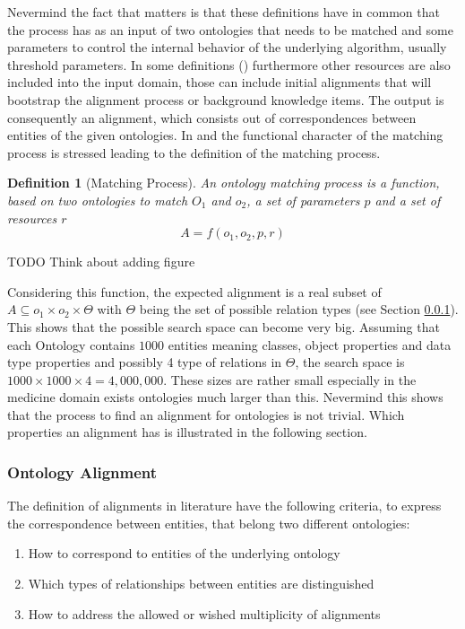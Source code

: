 \documentclass[11pt,titlepage,oneside,openany,a4paper]{report}
\newtheorem{definition}{Definition}[chapter]
\begin{document}
Nevermind the fact that matters is that these definitions have in common that the process has as an input of two ontologies that needs to be matched and some parameters to control the internal behavior of the underlying algorithm, usually threshold parameters. In some definitions (\cite{euzenat2004api}) furthermore other resources are also included into the input domain, those can include initial alignments that will bootstrap the alignment process or background knowledge items. The output is consequently an alignment, which consists out of correspondences between entities of the given ontologies. In \cite{euzenat2013d} and  \cite{ehrig2006ontology} the functional character of the matching process is stressed leading to the definition of the matching process.

\begin{definition} [Matching Process]
\label{def::Matching_process}
An ontology matching process is a function, based on two ontologies to match $O_1$ and $o_2$, a set of parameters $p$ and  a set of resources $r$
\begin{equation*}
A = f (o_1, o_2, p,r)
\end{equation*}
\end{definition}

\begin{LARGE}
TODO Think about adding figure
\end{LARGE}

Considering this function, the expected alignment is a real subset of $ A \subseteq o_1 \times o_2 \times \Theta$ with $\Theta$ being the set of possible relation types (see Section \ref{sec:oa_def}). This shows that the possible search space can become very big. Assuming that each Ontology contains $1000$ entities meaning classes, object properties and data type properties and possibly 4 type of relations in $\Theta$, the  search space is $1000 \times 1000 \times 4 = 4,000,000$. These sizes are rather small especially in the medicine domain exists ontologies much larger than this.  Nevermind this shows that the process to find an alignment for ontologies is not trivial. \cite{ehrig2006ontology}
Which properties an alignment has is illustrated in the following section.

\subsubsection{Ontology Alignment}
\label{sec:oa_def}
The definition of alignments in literature have the following criteria, to express the correspondence between entities, that belong two different ontologies:
\begin{enumerate}
\item How to correspond to entities of the underlying ontology
\item Which types of relationships between entities are distinguished
\item How to address the allowed or wished multiplicity of alignments
\end{enumerate}
\end{document}
